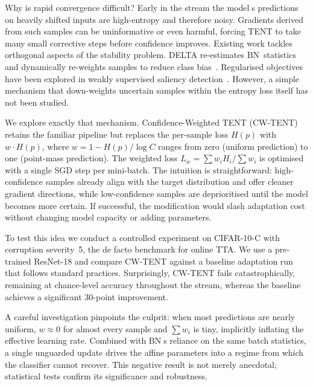 \documentclass{article} %
\begin{document}
Why is rapid convergence difficult? Early in the stream the models predictions on heavily shifted inputs are high-entropy and therefore noisy. Gradients derived from such samples can be uninformative or even harmful, forcing TENT to take many small corrective steps before confidence improves. Existing work tackles orthogonal aspects of the stability problem. DELTA re-estimates BN~statistics and dynamically re-weights samples to reduce class bias~\cite{zhao-2023-delta}. Regularised objectives have been explored in weakly supervised saliency detection~\cite{author-year-test}. However, a simple mechanism that down-weights uncertain samples within the entropy loss itself has not been studied.

We explore exactly that mechanism. Confidence-Weighted TENT (CW-TENT) retains the familiar pipeline but replaces the per-sample loss \(H(p)\) with \(w\cdot H(p)\), where \(w = 1 - H(p)/\log C\) ranges from zero (uniform prediction) to one (point-mass prediction). The weighted loss \(L_{w} = \sum w_i H_i / \sum w_i\) is optimised with a single SGD step per mini-batch. The intuition is straightforward: high-confidence samples already align with the target distribution and offer cleaner gradient directions, while low-confidence samples are deprioritised until the model becomes more certain. If successful, the modification would slash adaptation cost without changing model capacity or adding parameters.

To test this idea we conduct a controlled experiment on CIFAR-10-C with corruption severity~5, the de facto benchmark for online TTA\@. We use a pre-trained ResNet-18 and compare CW-TENT against a baseline adaptation run that follows standard practices. Surprisingly, CW-TENT fails catastrophically, remaining at chance-level accuracy throughout the stream, whereas the baseline achieves a significant 30-point improvement.

A careful investigation pinpoints the culprit: when most predictions are nearly uniform, \(w \approx 0\) for almost every sample and \(\sum w_i\) is tiny, implicitly inflating the effective learning rate. Combined with BNs reliance on the same batch statistics, a single unguarded update drives the affine parameters into a regime from which the classifier cannot recover. This negative result is not merely anecdotal; statistical tests confirm its significance and robustness.
\end{document}
